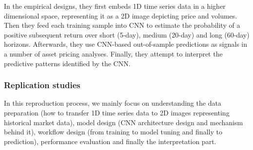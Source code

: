\documentclass[11pt]{article}
\begin{document}
In the empirical designs, they first embeds 1D time series data in a higher dimensional space, representing it as a 2D image depicting price and volumes. Then they feed each training sample into CNN to estimate the probability of a positive subsequent return over short (5-day), medium (20-day) and long (60-day) horizons. Afterwards, they use CNN-based out-of-sample predictions as signals in a number of asset pricing analyses. Finally, they attempt to interpret the predictive patterns identified by the CNN.

\subsubsection{Replication studies}
In this reproduction process, we mainly focus on understanding the data preparation (how to transfer 1D time series data to 2D images representing historical market data), model design (CNN architecture design and mechanism behind it), workflow design (from training to model tuning and finally to prediction), performance evaluation and finally the interpretation part.
\end{document}
